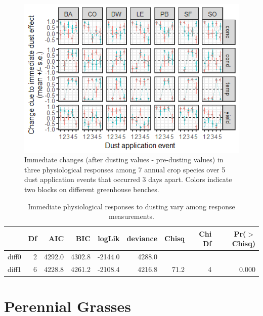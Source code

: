 \documentclass[]{scrartcl}
\begin{document}
\begin{figure}
\centering
\includegraphics{figures/diff_gg-1.png}
\caption{Immediate changes (after dusting values - pre-dusting values)
in three physiological responses among 7 annual crop species over 5 dust
application events that occurred 3 days apart. Colors indicate two
blocks on different greenhouse benches.}
\end{figure}

\begin{table}[ht]
\centering
\begin{tabular}{lrrrrrrrr}
  \hline
 & Df & AIC & BIC & logLik & deviance & Chisq & Chi Df & Pr($>$Chisq) \\ 
  \hline
diff0 & 2 & 4292.0 & 4302.8 & -2144.0 & 4288.0 &  &  &  \\ 
  diff1 & 6 & 4228.8 & 4261.2 & -2108.4 & 4216.8 & 71.2 & 4 & 0.000 \\ 
   \hline
\end{tabular}
\caption{Immediate physiological responses to dusting vary among response measurements.} 
\end{table}

\clearpage

\hypertarget{perennial-grasses}{%
\section{Perennial Grasses}\label{perennial-grasses}}
\end{document}
